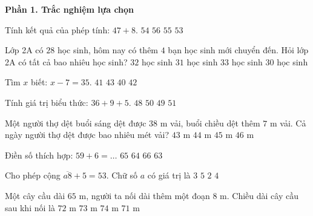 \textbf{Phần 1. Trắc nghiệm lựa chọn}

\begin{ex} %
Tính kết quả của phép tính: $47 + 8$.
\choice
{$54$}
{$56$}
{\True $55$}
{$53$}
\end{ex}

\begin{ex} %
Lớp 2A có $28$ học sinh, hôm nay có thêm $4$ bạn học sinh mới chuyển đến. Hỏi lớp 2A có tất cả bao nhiêu học sinh?
\choice
{\True $32$ học sinh}
{$31$ học sinh}
{$33$ học sinh}
{$30$ học sinh}
\end{ex}

\begin{ex} %
Tìm $x$ biết: $x - 7 = 35$.
\choice
{$41$}
{$43$}
{$40$}
{\True $42$}
\end{ex}

\begin{ex} %
Tính giá trị biểu thức: $36 + 9 + 5$.
\choice
{$48$}
{\True $50$}
{$49$}
{$51$}
\end{ex}

\begin{ex} %
Một người thợ dệt buổi sáng dệt được $38\text{ m}$ vải, buổi chiều dệt thêm $7\text{ m}$ vải. Cả ngày người thợ dệt được bao nhiêu mét vải?
\choice
{$43\text{ m}$}
{$44\text{ m}$}
{\True $45\text{ m}$}
{$46\text{ m}$}
\end{ex}

\begin{ex} %
Điền số thích hợp: $59 + 6 = \dots$
\choice
{\True $65$}
{$64$}
{$66$}
{$63$}
\end{ex}

\begin{ex} %
Cho phép cộng $\overline{a8} + 5 = 53$. Chữ số $a$ có giá trị là
\choice
{$3$}
{$5$}
{$2$}
{\True $4$}
\end{ex}

\begin{ex} %
Một cây cầu dài $65\text{ m}$, người ta nối dài thêm một đoạn $8\text{ m}$. Chiều dài cây cầu sau khi nối là
\choice
{$72\text{ m}$}
{\True $73\text{ m}$}
{$74\text{ m}$}
{$71\text{ m}$}
\end{ex}

